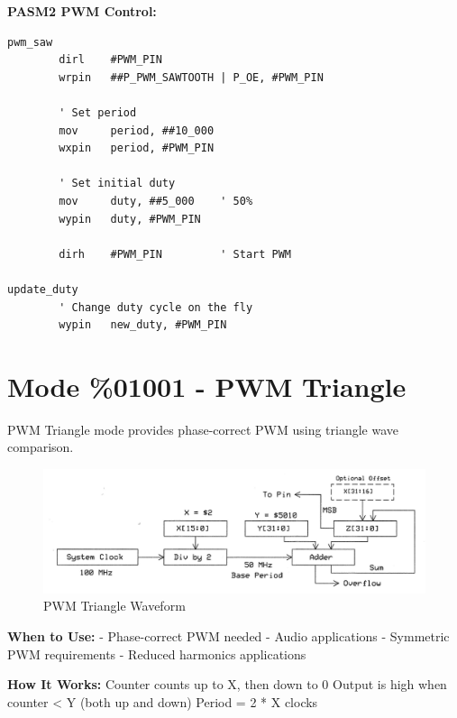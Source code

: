 \documentclass[11pt,a4paper,oneside,english]{book}
\begin{document}
\textbf{PASM2 PWM Control:}

\begin{PASM2Block}
\begin{lstlisting}
pwm_saw
        dirl    #PWM_PIN
        wrpin   ##P_PWM_SAWTOOTH | P_OE, #PWM_PIN
        
        ' Set period
        mov     period, ##10_000
        wxpin   period, #PWM_PIN
        
        ' Set initial duty
        mov     duty, ##5_000    ' 50%
        wypin   duty, #PWM_PIN
        
        dirh    #PWM_PIN         ' Start PWM
        
update_duty
        ' Change duty cycle on the fly
        wypin   new_duty, #PWM_PIN
\end{lstlisting}
\end{PASM2Block}

\clearpage

\hypertarget{mode-01001---pwm-triangle}{%
\section{Mode \%01001 - PWM Triangle}\label{mode-01001---pwm-triangle}}

PWM Triangle mode provides phase-correct PWM using triangle wave
comparison.

\begin{figure}
\centering
\includegraphics{assets/P2 SmartPins-220809_page17_img02.png}
\caption{PWM Triangle Waveform}
\end{figure}

\textbf{When to Use:} - Phase-correct PWM needed - Audio applications -
Symmetric PWM requirements - Reduced harmonics applications

\textbf{How It Works:} Counter counts up to X, then down to 0 Output is
high when counter \textless{} Y (both up and down) Period = 2 * X clocks
\end{document}
